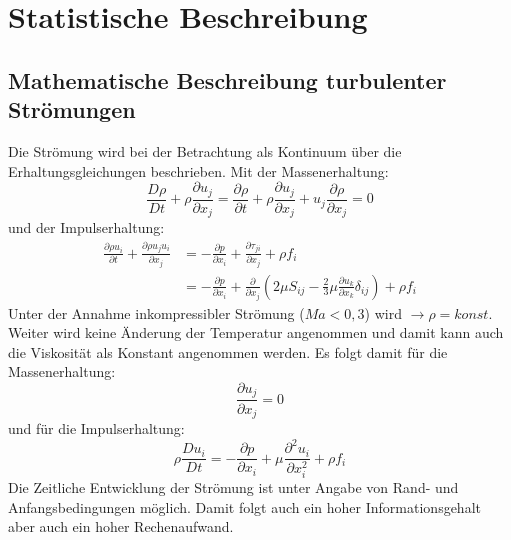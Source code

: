\section{Statistische Beschreibung}
\label{sec:StatistischeBeschreibung}
\subsection{Mathematische Beschreibung turbulenter Strömungen}
Die Strömung wird bei der Betrachtung als Kontinuum über die Erhaltungsgleichungen beschrieben. Mit der Massenerhaltung:
\begin{equation}
	\frac{D \rho}{D t}+\rho \frac{\partial u_{j}}{\partial x_{j}}=\frac{\partial \rho}{\partial t}+\rho \frac{\partial u_{j}}{\partial x_{j}}+u_{j} \frac{\partial \rho}{\partial x_{j}}=0
\end{equation}
und der Impulserhaltung:
\begin{equation}
	\begin{aligned}
		\frac{\partial \rho u_{i}}{\partial t}+\frac{\partial \rho u_{j} u_{i}}{\partial x_{j}} &=-\frac{\partial p}{\partial x_{i}}+\frac{\partial \tau_{j i}}{\partial x_{j}}+\rho f_{i} \\
		&=-\frac{\partial p}{\partial x_{i}}+\frac{\partial}{\partial x_{j}}\left(2 \mu S_{i j}-\frac{2}{3} \mu \frac{\partial u_{k}}{\partial x_{k}} \delta_{i j}\right)+\rho f_{i}
	\end{aligned}
\end{equation}
Unter der Annahme inkompressibler Strömung ($Ma <0,3$) wird $\rightarrow \rho = konst.$ Weiter wird keine Änderung der Temperatur angenommen und damit kann auch die Viskosität als Konstant angenommen werden. Es folgt damit für die Massenerhaltung: 
\begin{equation}
	\frac{\partial u_{j}}{\partial x_{j}}=0
\end{equation}
und für die Impulserhaltung:
\begin{equation}
	\rho \frac{Du_i}{Dt} = -\frac{\partial p}{\partial x_i}+\mu \frac{\partial^2 u_i}{\partial x^{2}_{i}} + \rho f_i
\end{equation}
Die Zeitliche Entwicklung der Strömung ist unter Angabe von Rand- und Anfangsbedingungen möglich. Damit folgt auch ein hoher Informationsgehalt aber auch ein hoher Rechenaufwand. 